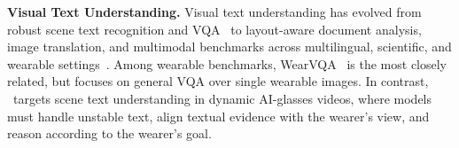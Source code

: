 \documentclass[11pt]{article}
\theoremstyle{plain}
\theoremstyle{definition}
\theoremstyle{remark}
\begin{document}






\noindent\textbf{Visual Text Understanding.}
Visual text understanding has evolved from robust scene text recognition and VQA~\cite{zhang2021robust,8953586,biten2019scene} to layout-aware document analysis, image translation, and multimodal benchmarks across multilingual, scientific, and wearable settings~\cite{zhang2026promptdla,zhang2025reading,liang2025ssr,zhang2025icdardimt,li2026mmtit,zhang2025hiscibench,chang2025wearvqa}.
Among wearable benchmarks, WearVQA~\cite{chang2025wearvqa} is the most closely related, but focuses on general VQA over single wearable images.
In contrast, \dataset~targets scene text understanding in dynamic AI-glasses videos, where models must handle unstable text, align textual evidence with the wearer's view, and reason according to the wearer's goal.
\end{document}
